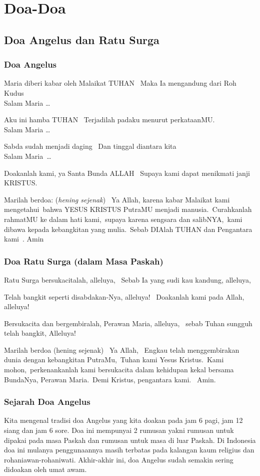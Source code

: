 \chapter{Doa-Doa}

\section{Doa Angelus dan Ratu Surga}
\subsection*{Doa Angelus}
Maria diberi kabar oleh Malaikat TUHAN~ Maka Ia mengandung dari Roh
Kudus~ \\
Salam Maria {\ldots}~  

Aku ini hamba TUHAN~ Terjadilah padaku menurut
perkataanMU.~ \\
Salam Maria {\ldots}~  

Sabda sudah menjadi daging~ Dan tinggal
diantara kita~ \\
Salam Maria~{\ldots}  

Doakanlah kami, ya Santa Bunda
ALLAH~ Supaya kami dapat menikmati janji KRISTUS.~

Marilah berdoa: (\textit{hening sejenak})~ Ya Allah, karena kabar Malaikat kami
mengetahui~bahwa YESUS KRISTUS PutraMU menjadi manusia.~Curahkanlah
rahmatMU ke dalam hati kami,~supaya karena sengsara dan salibNYA,~kami
dibawa kepada kebangkitan yang mulia.~Sebab DIAlah TUHAN dan Pengantara
kami~.  Amin~

\subsection*{Doa Ratu Surga (dalam Masa Paskah)}
Ratu Surga bersukacitalah, alleluya,~ Sebab Ia yang sudi kau kandung,
alleluya,~

 Telah bangkit seperti disabdakan-Nya, alleluya!~ Doakanlah kami pada
Allah, alleluya!~

 Bersukacita dan bergembiralah, Perawan Maria, alleluya,~ sebab Tuhan
sungguh telah bangkit, Alleluya!~

Marilah berdoa (hening sejenak)~ Ya Allah,~ Engkau telah menggembirakan
dunia dengan kebangkitan PutraMu,~Tuhan kami Yesus Kristus.~Kami
mohon,~perkenankanlah kami bersukacita dalam kehidupan kekal bersama
BundaNya, Perawan Maria.~Demi Kristus, pengantara kami.~ Amin.

\subsection*{Sejarah Doa Angelus}
Kita mengenal tradisi doa Angelus yang kita doakan pada jam 6 pagi, jam
12 siang dan jam 6 sore. Doa ini mempunyai 2 rumusan yakni rumusan
untuk dipakai pada masa Paskah dan rumusan untuk masa di luar Paskah.
Di Indonesia doa ini mulanya penggunaannya masih terbatas pada kalangan
kaum religius dan rohaniawan-rohaniwati. Akhir-akhir ini, doa Angelus
sudah semakin sering didoakan oleh umat awam.

